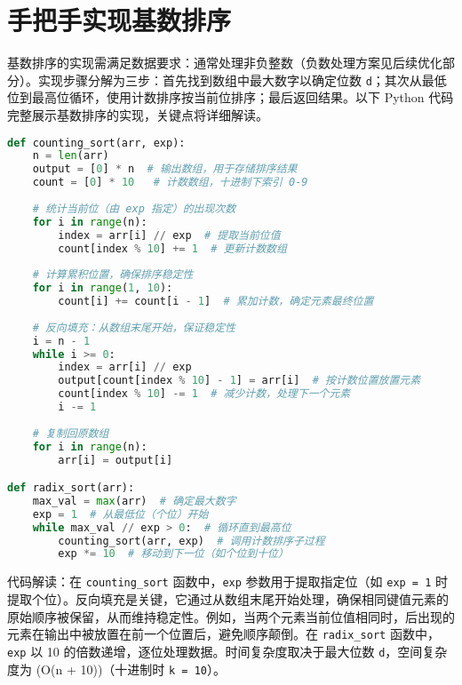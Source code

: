 \chapter{手把手实现基数排序}
基数排序的实现需满足数据要求：通常处理非负整数（负数处理方案见后续优化部分）。实现步骤分解为三步：首先找到数组中最大数字以确定位数 \texttt{d}；其次从最低位到最高位循环，使用计数排序按当前位排序；最后返回结果。以下 Python 代码完整展示基数排序的实现，关键点将详细解读。\par
\begin{lstlisting}[language=python]
def counting_sort(arr, exp):
    n = len(arr)
    output = [0] * n  # 输出数组，用于存储排序结果
    count = [0] * 10   # 计数数组，十进制下索引 0-9
    
    # 统计当前位（由 exp 指定）的出现次数
    for i in range(n):
        index = arr[i] // exp  # 提取当前位值
        count[index % 10] += 1  # 更新计数数组
    
    # 计算累积位置，确保排序稳定性
    for i in range(1, 10):
        count[i] += count[i - 1]  # 累加计数，确定元素最终位置
    
    # 反向填充：从数组末尾开始，保证稳定性
    i = n - 1
    while i >= 0:
        index = arr[i] // exp
        output[count[index % 10] - 1] = arr[i]  # 按计数位置放置元素
        count[index % 10] -= 1  # 减少计数，处理下一个元素
        i -= 1
    
    # 复制回原数组
    for i in range(n):
        arr[i] = output[i]

def radix_sort(arr):
    max_val = max(arr)  # 确定最大数字
    exp = 1  # 从最低位（个位）开始
    while max_val // exp > 0:  # 循环直到最高位
        counting_sort(arr, exp)  # 调用计数排序子过程
        exp *= 10  # 移动到下一位（如个位到十位）
\end{lstlisting}
代码解读：在 \texttt{counting\_{}sort} 函数中，\texttt{exp} 参数用于提取指定位（如 \texttt{exp = 1} 时提取个位）。反向填充是关键，它通过从数组末尾开始处理，确保相同键值元素的原始顺序被保留，从而维持稳定性。例如，当两个元素当前位值相同时，后出现的元素在输出中被放置在前一个位置后，避免顺序颠倒。在 \texttt{radix\_{}sort} 函数中，\texttt{exp} 以 10 的倍数递增，逐位处理数据。时间复杂度取决于最大位数 \texttt{d}，空间复杂度为 (O(n + 10))（十进制时 \texttt{k = 10}）。\par
